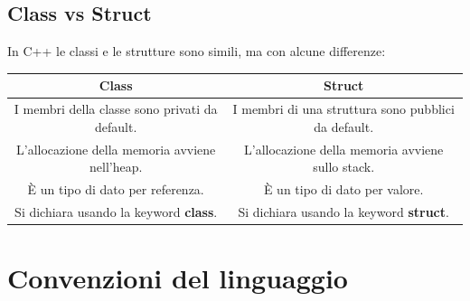\subsection{Class vs Struct}

\textsf{\small In C++ le classi e le strutture sono simili, ma con alcune differenze:} \break

\begin{tabular}{|c|c|}
	\hline
	\textbf{Class} & \textbf{Struct} \\
	\hline
	\textsf{\small I membri della classe sono privati da default.} & \textsf{\small I membri di una struttura sono pubblici da default.} \\
	\hline
	\textsf{\small L'allocazione della memoria avviene nell'heap.} & \textsf{\small L'allocazione della memoria avviene sullo stack.} \\
	\hline
	\textsf{\small È un tipo di dato per referenza.} & \textsf{\small È un tipo di dato per valore.} \\
	\hline
	\textsf{\small Si dichiara usando la keyword \textbf{class}.} & \textsf{\small Si dichiara usando la keyword \textbf{struct}.} \\
	\hline
\end{tabular}








\newpage

\section{Convenzioni del linguaggio}


